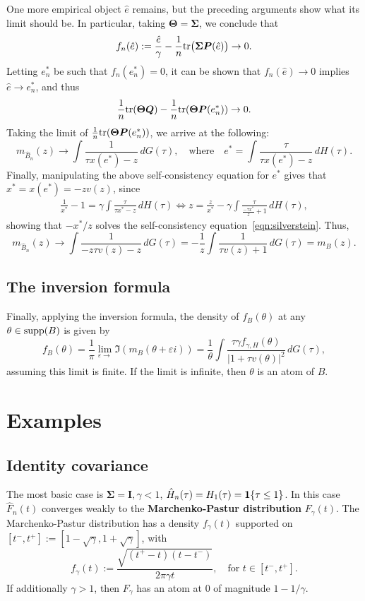 \documentclass{article}
\newcommand{\bSigma}{\boldsymbol{\Sigma}}
\newcommand{\bTheta}{\boldsymbol{\Theta}}
\newcommand{\bQ}{\boldsymbol{Q}}
\newcommand{\bP}{\boldsymbol{P}}
\newcommand{\bI}{\boldsymbol{I}}
\begin{document}
One more empirical object $\hat{e}$ remains, but the preceding arguments show what its limit should be. In particular, taking $\bTheta = \bSigma$, we conclude that
$$
f_n(\hat{e}) := \frac{\hat{e}}{\gamma} - \frac{1}{n}\tr\big(\bSigma \bP(\hat{e})\big) \to 0.
$$
Letting $e_n^{\ast}$ be such that $f_n(e_n^{\ast}) = 0$, it can be shown that $f_n(\hat{e}) \to 0$ implies $\hat{e} \to e_n^{\ast}$, and thus
\begin{equation}
	\frac{1}{n}\tr(\bTheta \bQ) - \frac{1}{n}\tr(\bTheta \bP(e_n^{\ast})) \to 0.
\end{equation}
Taking the limit of $\frac{1}{n}\tr(\bTheta \bP(e_n^{\ast}))$, we arrive at the following:
$$
m_{\hat{B}_n}(z) \to \int \frac{1}{\tau x(e^{\ast}) - z} \,dG(\tau), \quad \textrm{where} \quad e^{\ast} = \int \frac{\tau}{\tau x(e^{\ast}) - z} \,dH(\tau).
$$
Finally, manipulating the above self-consistency equation for $e^{\ast}$ gives that $x^{\ast} = x(e^{\ast}) = -z v(z)$, since
\begin{align*}
	\frac{1}{x^{\ast}} - 1 = \gamma \int \frac{\tau}{\tau x^{\ast} - z} \,dH(\tau) \Longleftrightarrow z = \frac{z}{x^{\ast}} - \gamma \int \frac{\tau}{\frac{-\tau x^{\ast}}{z} + 1} \,dH(\tau),
\end{align*}
showing that $-x^{\ast}/z$ solves the self-consistency equation~\eqref{eqn:silverstein}. Thus, 
$$
m_{\hat{B}_n}(z) \to \int \frac{1}{-z \tau v(z) - z} \,dG(\tau) = -\frac{1}{z} \int \frac{1}{\tau v(z) + 1} \,dG(\tau) = m_{B}(z).
$$
\subsection{The inversion formula}
Finally, applying the inversion formula, the density of $f_{B}(\theta)$ at any $\theta \in \mathrm{supp}(B)$ is given by
$$
f_{B}(\theta) = \frac{1}{\pi}\lim_{\varepsilon \to} \Im(m_B(\theta + \varepsilon i)) = \frac{1}{\theta} \int \frac{\tau \gamma f_{\gamma,H}(\theta)}{|1 + \tau v(\theta)|^2} \,dG(\tau),
$$
assuming this limit is finite. If the limit is infinite, then $\theta$ is an atom of $B$. 

\section{Examples}

\subsection{Identity covariance}

The most basic case is $\bSigma = \bI, \gamma < 1$, $\hat{H}_n(\tau) = H_1(\tau) = \mathbf{1}\{\tau \leq 1\}$. In this case $\hat{F}_n(t)$ converges weakly to the {\bf Marchenko-Pastur distribution} $F_{\gamma}(t)$. The Marchenko-Pastur distribution has a density $f_{\gamma}(t)$ supported on $[t^{-},t^{+}] := [1 - \sqrt{\gamma}, 1 + \sqrt{\gamma}]$, with 
$$
f_{\gamma}(t) := \frac{\sqrt{(t^{+} - t)(t - t^{-})}}{2 \pi \gamma t}, \quad \textrm{for $t \in [t^{-},t^{+}]$.}
$$
If additionally $\gamma > 1$, then $F_{\gamma}$ has an atom at $0$ of magnitude $1 - 1/\gamma$. 
\end{document}
